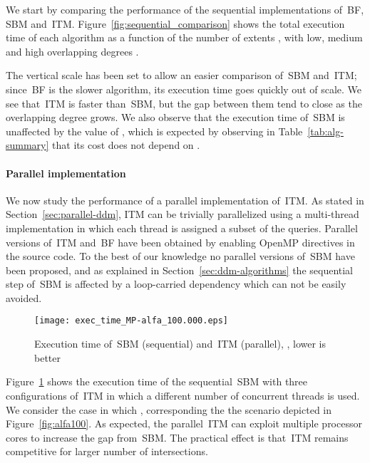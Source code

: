 \documentclass[10pt, conference, compsocconf]{IEEEtran}
\begin{document}
We start by comparing the performance of the sequential
implementations of~\ac{BF}, \ac{SBM} and~\ac{ITM}.
Figure~\ref{fig:sequential_comparison} shows the total execution time
of each algorithm as a function of the number of extents , with
low, medium and high overlapping degrees .

The vertical scale has been set to allow an easier comparison
of~\ac{SBM} and~\ac{ITM}; since~\acl{BF} is the slower algorithm, its
execution time goes quickly out of scale. We see that~\ac{ITM} is
faster than~\ac{SBM}, but the gap between them tend to close as the
overlapping degree  grows. We also observe that the execution
time of~\ac{SBM} is unaffected by the value of , which is
expected by observing in Table~\ref{tab:alg-summary} that its cost
does not depend on .

\paragraph*{Parallel implementation}

We now study the performance of a parallel implementation of~\ac{ITM}.
As stated in Section~\ref{sec:parallel-ddm}, \ac{ITM} can be trivially
parallelized using a multi-thread implementation in which each
thread is assigned a subset of the queries. Parallel versions
of~\ac{ITM} and~\ac{BF} have been obtained by enabling OpenMP
directives in the source code.  To the best of our knowledge no
parallel versions of~\ac{SBM} have been proposed, and as explained in
Section~\ref{sec:ddm-algorithms} the sequential step of~\ac{SBM} is
affected by a loop-carried dependency which can not be easily avoided.

\begin{figure}[t]
\centering \texttt{[image: exec\_time\_MP-alfa\_100.000.eps]}
\caption{Execution time of~\ac{SBM} (sequential) and~\ac{ITM}
  (parallel), , lower is
  better}\label{fig:parallel_comparison_wct}
\end{figure}

Figure~\ref{fig:parallel_comparison_wct} shows the execution time of
the sequential~\ac{SBM} with three configurations of~\ac{ITM} in which
a different number of concurrent threads is used. We consider the case
in which , corresponding the the scenario depicted in
Figure~\ref{fig:alfa100}. As expected, the parallel~\ac{ITM} can
exploit multiple processor cores to increase the gap from~\ac{SBM}.
The practical effect is that~\ac{ITM} remains competitive for larger
number of intersections.
\end{document}
